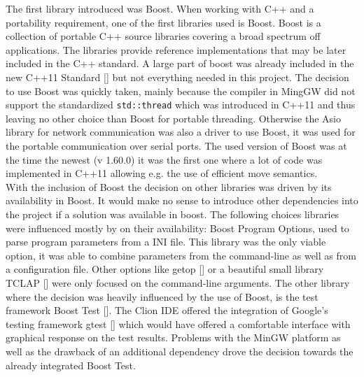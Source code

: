 The first library introduced was Boost. When working with C++ and a portability requirement, one of the first libraries used is Boost. Boost is a collection of portable C++ source libraries covering a broad spectrum off applications. The libraries provide reference implementations that may be later included in the C++ standard. A large part of boost was already included in the new C++11 Standard [] but not everything needed in this project. The decision to use Boost was quickly taken, mainly because the compiler in MingGW did not support the standardized \texttt{std::thread} which was introduced in C++11 and thus leaving no other choice than Boost for portable threading. Otherwise the Asio library for network communication was also a driver to use Boost, it was used for the portable communication over serial ports. The used version of Boost was at the time the newest (v 1.60.0) it was the first one where a lot of code was implemented in C++11 allowing e.g. the use of efficient move semantics.\\
With the inclusion of Boost the decision on other libraries was driven by its availability in Boost. It would make no sense to introduce other dependencies into the project if a solution was available in boost. The following choices libraries were influenced mostly by on their availability: Boost Program Options, used to parse program parameters from a INI file. This library was the only viable option, it was able to combine parameters from the command-line as well as from a configuration file. Other options like getop [] or a beautiful small library TCLAP [] were only focused on the command-line arguments. The other library where the decision was heavily influenced by the use of Boost, is the test framework Boost Test []. The Clion IDE offered the integration of Google's testing framework gtest [] which would have offered a comfortable interface with graphical response on the test results. Problems with the MinGW platform as well as the drawback of an additional dependency drove the decision towards the already integrated Boost Test.

